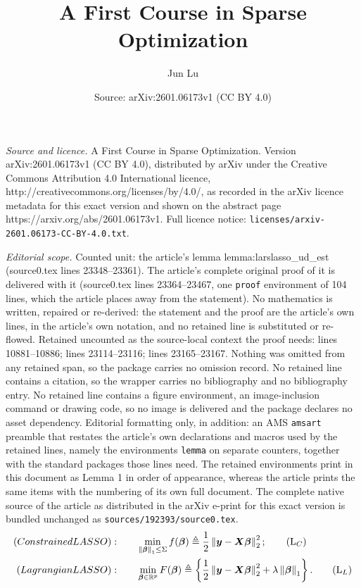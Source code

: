 \documentclass[10pt,a4paper]{amsart}
\title{A First Course in Sparse Optimization}
\author{Jun Lu}
\date{Source: arXiv:2601.06173v1 (CC BY 4.0)}
\newcommand{\bX}{{\bm{X}}}
\newcommand{\bbeta}{{\boldsymbol\beta}}
\newcommand{\by}{{\bm{y}}}
\newcommand\mathopmin[1]{\mathop{\min}_{#1}}
\newcommand\normone[1]{\left\lVert#1\right\rVert_1}
\newcommand\normtwo[1]{\left\lVert#1\right\rVert_2}
\newcommand{\real}{\mathbb{R}}
\begin{document}
\maketitle

\noindent\emph{Source and licence.} A First Course in Sparse Optimization. Version arXiv:2601.06173v1 (CC BY 4.0), distributed by arXiv under the Creative Commons Attribution 4.0 International licence, http://creativecommons.org/licenses/by/4.0/, as recorded in the arXiv licence metadata for this exact version and shown on the abstract page https://arxiv.org/abs/2601.06173v1. Full licence notice: \texttt{licenses/arxiv-2601.06173-CC-BY-4.0.txt}.\par\smallskip

\noindent\textit{Editorial scope.} Counted unit: the article's lemma lemma:larslasso\_ud\_est (source0.tex lines 23348--23361). The article's complete original proof of it is delivered with it (source0.tex lines 23364--23467, one \texttt{proof} environment of 104 lines, which the article places away from the statement). No mathematics is written, repaired or re-derived: the statement and the proof are the article's own lines, in the article's own notation, and no retained line is substituted or re-flowed.  Retained uncounted as the source-local context the proof needs: lines 10881--10886; lines 23114--23116; lines 23165--23167.  Nothing was omitted from any retained span, so the package carries no omission record.  No retained line contains a citation, so the wrapper carries no bibliography and no bibliography entry.  No retained line contains a figure environment, an image-inclusion command or drawing code, so no image is delivered and the package declares no asset dependency.  Editorial formatting only, in addition: an AMS \texttt{amsart} preamble that restates the article's own declarations and macros used by the retained lines, namely the environments \texttt{lemma} on separate counters, together with the standard packages those lines need.  The retained environments print in this document as Lemma 1 in order of appearance, whereas the article prints the same items with the numbering of its own full document.  The complete native source of the article as distributed in the arXiv e-print for this exact version is bundled unchanged as \texttt{sources/192393/source0.tex}.
\begin{align}
(\textbf{Constrained LASSO}):\qquad &\mathopmin{\normone{\bbeta}\leq \Sigma}f(\bbeta)\triangleq \frac{1}{2}\normtwo{\by - \bX \bbeta}^2;
\label{opt:lc} \tag{L$_{C}$}\\
(\textbf{Lagrangian LASSO}):\qquad &\mathopmin{\bbeta \in \real^p}F(\bbeta)\triangleq \left\{ \frac{1}{2} \normtwo{\by - \bX \bbeta}^2 + \lambda \normone{\bbeta} \right\}. 
\label{opt:ll} \tag{L$_{L}$}
\end{align}
\end{document}
